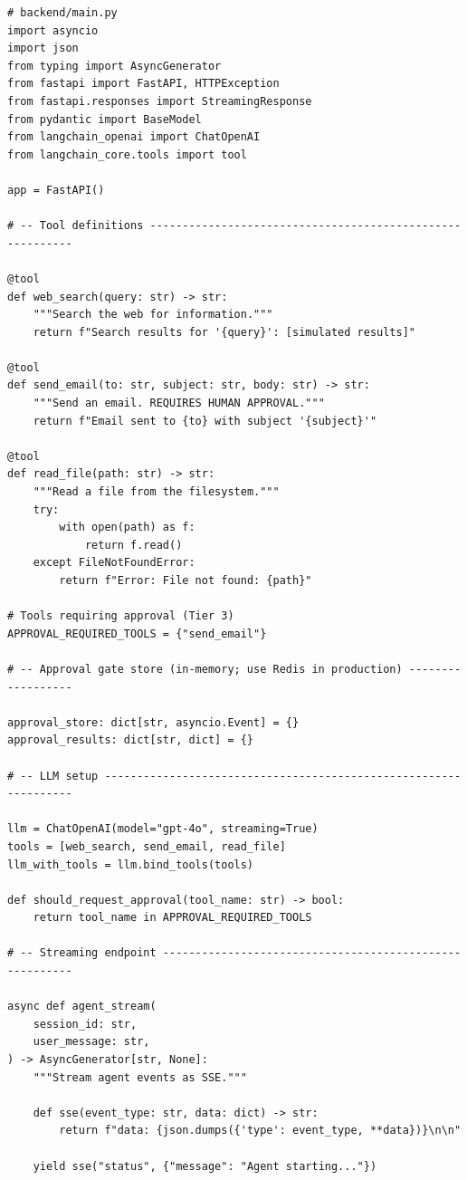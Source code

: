 \begin{lstlisting}[style=pythonstyle, caption={FastAPI backend with streaming and approval gates}]
# backend/main.py
import asyncio
import json
from typing import AsyncGenerator
from fastapi import FastAPI, HTTPException
from fastapi.responses import StreamingResponse
from pydantic import BaseModel
from langchain_openai import ChatOpenAI
from langchain_core.tools import tool

app = FastAPI()

# -- Tool definitions ----------------------------------------------------------

@tool
def web_search(query: str) -> str:
    """Search the web for information."""
    return f"Search results for '{query}': [simulated results]"

@tool
def send_email(to: str, subject: str, body: str) -> str:
    """Send an email. REQUIRES HUMAN APPROVAL."""
    return f"Email sent to {to} with subject '{subject}'"

@tool
def read_file(path: str) -> str:
    """Read a file from the filesystem."""
    try:
        with open(path) as f:
            return f.read()
    except FileNotFoundError:
        return f"Error: File not found: {path}"

# Tools requiring approval (Tier 3)
APPROVAL_REQUIRED_TOOLS = {"send_email"}

# -- Approval gate store (in-memory; use Redis in production) ------------------

approval_store: dict[str, asyncio.Event] = {}
approval_results: dict[str, dict] = {}

# -- LLM setup -----------------------------------------------------------------

llm = ChatOpenAI(model="gpt-4o", streaming=True)
tools = [web_search, send_email, read_file]
llm_with_tools = llm.bind_tools(tools)

def should_request_approval(tool_name: str) -> bool:
    return tool_name in APPROVAL_REQUIRED_TOOLS

# -- Streaming endpoint --------------------------------------------------------

async def agent_stream(
    session_id: str,
    user_message: str,
) -> AsyncGenerator[str, None]:
    """Stream agent events as SSE."""

    def sse(event_type: str, data: dict) -> str:
        return f"data: {json.dumps({'type': event_type, **data})}\n\n"

    yield sse("status", {"message": "Agent starting..."})


\end{lstlisting}
